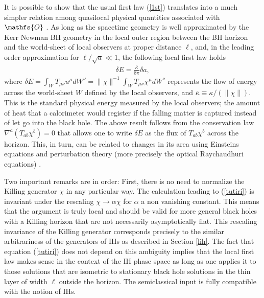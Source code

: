 \documentclass[aps, nofootinbib,superscriptaddress,12pt]{revtex4-2}
\newcommand{\mfs}[1]{\mathfs {#1}}                               %
\newcommand{\sH}{{\mfs H}}
\newcommand{\sO}{{\mfs O}}
\begin{document}

It is possible to show that the usual first law (\ref{1st}) translates into a much simpler relation among quasilocal physical quantities associated with $\mfs O$ \cite{Frodden:2011zz, Frodden:2011eb}.  As long as the spacetime geometry is well approximated by the Kerr Newman BH geometry in the local outer region between the BH horizon and the world-sheet of local observers at proper distance $\ell$, and, in the leading order approximation for $\ell/\sqrt{a}\ll 1$, the following  local 
first law holds
\begin{eqnarray}\label{tutiri}
\delta E =\frac{\overline\kappa}{8\pi}\delta a,
\end{eqnarray}
where 
$\delta E=\int_W T_{\mu\nu} u^\mu dW^\nu=\|\chi\|^{-1} \int_W T_{\mu\nu} \chi^\mu dW^\nu$ represents the flow of energy across the world-sheet $W$ defined by the local observers, and 
$\overline \kappa\equiv\kappa/(\|\chi\|)$.  This is the standard physical energy measured by the local observers; the amount of heat that a calorimeter would register if the falling matter is captured instead of let go into the black hole.  The above result follows from the conservation law $\nabla^a (T_{ab} \chi^b)=0$ that allows one to write
$\delta E$ as the flux of $T_{ab} \chi^b$ across the horizon. This, in turn, can be related to changes in its area  using Einsteins equations and perturbation theory (more precisely the optical 
Raychaudhuri equations) \cite{Frodden:2011eb}.

Two important remarks are in order:
 First, there is no need to normalize the Killing generator $\chi$ in any particular way. The calculation leading to (\ref{tutiri}) is invariant under the rescaling $\chi\to \alpha \chi$ for $\alpha$ a non vanishing constant. This means that the argument is truly local  and should be valid for more general black holes with a Killing horizon that are not necessarily asymptotically flat. This rescaling invariance of the Killing generator corresponds precisely to the similar arbitrariness of the generators of IHs as described in Section \ref{lih}. 
The fact that equation (\ref{tutiri}) does not depend on this ambiguity implies that  the local first law makes sense in the context of the IH phase space as long as one applies it to those solutions that are isometric to stationary black hole solutions in the thin layer of width $\ell$ outside the horizon. The semiclassical input is fully compatible with the notion of IHs. 
\end{document}
